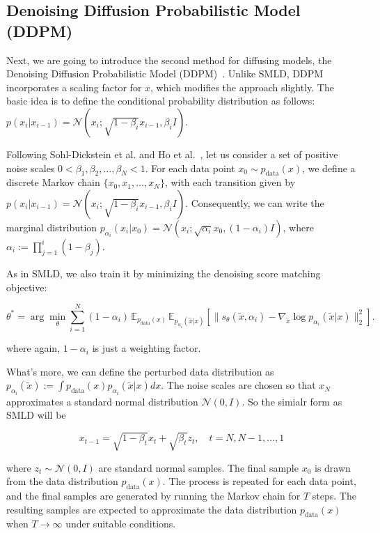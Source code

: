 \subsection{ Denoising Diffusion Probabilistic Model (DDPM)}
Next, we are going to introduce the second method for diffusing models, the Denoising Diffusion Probabilistic Model (DDPM)~\cite{DDPM_2020}. Unlike SMLD, DDPM incorporates a scaling factor for \( x \), which modifies the approach slightly. The basic idea is to define the conditional probability distribution as follows: \( p(x_i | x_{i-1}) = \mathcal{N} \left( x_i ; \sqrt{1 - \beta_i} x_{i-1}, \beta_i I \right) \).

Following Sohl-Dickstein et al. and Ho et al.~\cite{DDPM_2020}, let us consider a set of positive noise scales \( 0 < \beta_1, \beta_2, \dots, \beta_N < 1 \). For each data point \( x_0 \sim p_{\text{data}}(x) \), we define a discrete Markov chain \( \{x_0, x_1, \dots, x_N\} \), with each transition given by \( p(x_i | x_{i-1}) = \mathcal{N} \left( x_i ; \sqrt{1 - \beta_i} x_{i-1}, \beta_i I \right) \). Consequently, we can write the marginal distribution \( p_{\alpha_i}(x_i | x_0) = \mathcal{N} \left( x_i ; \sqrt{\alpha_i} x_0, (1 - \alpha_i) I \right) \), where \( \alpha_i := \prod_{j=1}^i (1 - \beta_j) \).

As in SMLD, we also train it by minimizing the denoising score matching objective:

\begin{equation}
\theta^* = \arg \min_{\theta} \sum_{i=1}^{N} (1-\alpha_i) \, \mathbb{E}_{p_{\text{data}}(x)} \, \mathbb{E}_{p_{\alpha_i}(\tilde{x} | x)} \left[ \| s_\theta(\tilde{x}, \alpha_i) - \nabla_{\tilde{x}} \log p_{\alpha_i}(\tilde{x} | x) \|_2^2 \right].
\end{equation}

where again, $1-\alpha_i$ is just a weighting factor.

What's more, we can define the perturbed data distribution as \( p_{\alpha_i}(\tilde{x}) := \int p_{\text{data}}(x) p_{\alpha_i}(\tilde{x} | x) dx \). The noise scales are chosen so that \( x_N \) approximates a standard normal distribution \( \mathcal{N}(0, I) \). So the simialr form as SMLD will be 

\begin{equation}
    x_{t-1} = \sqrt{1 - \beta_t} x_t + \sqrt{\beta_t} z_t, \quad t = N, N-1, \dots, 1  
\end{equation}

where \( z_t \sim \mathcal{N}(0, I) \) are standard normal samples. The final sample \( x_0 \) is drawn from the data distribution \( p_{\text{data}}(x) \). The process is repeated for each data point, and the final samples are generated by running the Markov chain for \( T \) steps. The resulting samples are expected to approximate the data distribution \( p_{\text{data}}(x) \) when \( T \to \infty \) under suitable conditions.
